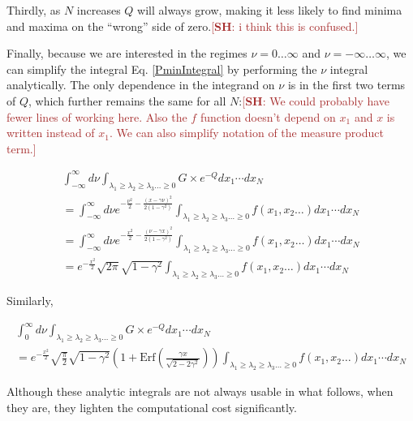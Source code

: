 \documentclass[12pt]{article}
\newcommand{\SH}[1]{\textcolor{brown}{[{\bf SH}: #1]}}
\begin{document}
Thirdly, as $N$ increases $Q$ will always grow, making it less likely to find minima and maxima on the ``wrong'' side of zero.\SH{i think this is confused.}

Finally, because we are interested in the regimes $\nu = 0 \ldots \infty$ and $\nu = -\infty \ldots \infty$, we can simplify the integral Eq. \ref{PminIntegral} by performing the $\nu$ integral analytically. The only dependence in the integrand on $\nu$ is in the first two terms of $Q$, which further remains the same for all $N$:\SH{We could probably have fewer lines of working here. Also the $f$ function doesn't depend on $x_1$ and $x$ is written instead of $x_1$. We can also simplify notation of the measure product term.}

\begin{equation}
\begin{split}
\int^\infty_{-\infty} d\nu \int_{\lambda_1 \geq \lambda_2 \geq \lambda_3 \ldots \geq 0} G \times e^{-Q} dx_1  \cdots dx_N \\ 
= \int^\infty_{-\infty} d\nu e^{-\frac{\nu^2}{2}- \frac{(x- \gamma \nu)^2}{2(1-\gamma^2)}} \int_{\lambda_1 \geq \lambda_2 \geq \lambda_3 \ldots \geq 0} f(x_1, x_2 \ldots) dx_1  \cdots dx_N \\
= \int^\infty_{-\infty} d\nu e^{-\frac{x^2}{2}- \frac{(\nu - \gamma x)^2}{2(1-\gamma^2)}} \int_{\lambda_1 \geq \lambda_2 \geq \lambda_3 \ldots \geq 0} f(x_1, x_2 \ldots) dx_1  \cdots dx_N \\
= e^{-\frac{x^2}{2}} \sqrt{2\pi}\sqrt{1-\gamma^2}  \int_{\lambda_1 \geq \lambda_2 \geq \lambda_3 \ldots \geq 0} f(x_1, x_2 \ldots) dx_1  \cdots dx_N
\end{split}
\end{equation}

Similarly, 

\begin{equation}
\begin{split}
\int^\infty_0 d\nu \int_{\lambda_1 \geq \lambda_2 \geq \lambda_3 \ldots \geq 0} G \times e^{-Q} dx_1  \cdots dx_N \\ 
= e^{-\frac{x^2}{2}} \sqrt{\frac{\pi}{2}}\sqrt{1-\gamma^2} (1+\mathrm{Erf}(\frac{\gamma x}{\sqrt{2-2\gamma^2}})) \int_{\lambda_1 \geq \lambda_2 \geq \lambda_3 \ldots \geq 0} f(x_1, x_2 \ldots) dx_1  \cdots dx_N
\end{split}
\end{equation}

Although these analytic integrals are not always usable in what follows, when they are, they lighten the computational cost significantly.
\end{document}
